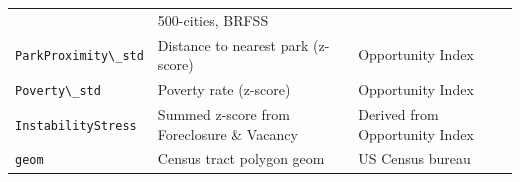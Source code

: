 \documentclass[
]{book}
\newcommand{\passthrough}[1]{#1}
\begin{document}
\begin{longtable}[]{@{}lll@{}}
\begin{minipage}[t]{0.40\columnwidth}
\end{minipage} & \begin{minipage}[t]{0.30\columnwidth}\raggedright
500-cities, BRFSS\strut
\end{minipage}\tabularnewline
\begin{minipage}[t]{0.21\columnwidth}\raggedright
\passthrough{\lstinline!ParkProximity\_std!}\strut
\end{minipage} & \begin{minipage}[t]{0.40\columnwidth}\raggedright
Distance to nearest park (z-score)\strut
\end{minipage} & \begin{minipage}[t]{0.30\columnwidth}\raggedright
Opportunity Index\strut
\end{minipage}\tabularnewline
\begin{minipage}[t]{0.21\columnwidth}\raggedright
\passthrough{\lstinline!Poverty\_std!}\strut
\end{minipage} & \begin{minipage}[t]{0.40\columnwidth}\raggedright
Poverty rate (z-score)\strut
\end{minipage} & \begin{minipage}[t]{0.30\columnwidth}\raggedright
Opportunity Index\strut
\end{minipage}\tabularnewline
\begin{minipage}[t]{0.21\columnwidth}\raggedright
\passthrough{\lstinline!InstabilityStress!}\strut
\end{minipage} & \begin{minipage}[t]{0.40\columnwidth}\raggedright
Summed z-score from Foreclosure \& Vacancy\strut
\end{minipage} & \begin{minipage}[t]{0.30\columnwidth}\raggedright
Derived from Opportunity Index\strut
\end{minipage}\tabularnewline
\begin{minipage}[t]{0.21\columnwidth}\raggedright
\passthrough{\lstinline!geom!}\strut
\end{minipage} & \begin{minipage}[t]{0.40\columnwidth}\raggedright
Census tract polygon geom\strut
\end{minipage} & \begin{minipage}[t]{0.30\columnwidth}\raggedright
US Census bureau\strut
\end{minipage}\tabularnewline
\bottomrule
\end{longtable}
\end{document}
